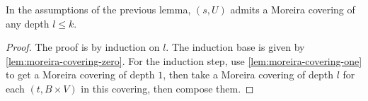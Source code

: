 \begin{theorem}%
  \label{thm:moreira-covering-exists}
  In the assumptions of the previous lemma, \((s, U)\) admits a Moreira covering of any depth \(l \le k\).
\end{theorem}

\begin{proof}
  The proof is by induction on \(l\).
  The induction base is given by \autoref{lem:moreira-covering-zero}.
  For the induction step, use \autoref{lem:moreira-covering-one} to get a Moreira covering of depth \(1\),
  then take a Moreira covering of depth \(l\) for each \((t, B\times V)\) in this covering,
  then compose them.
\end{proof}

